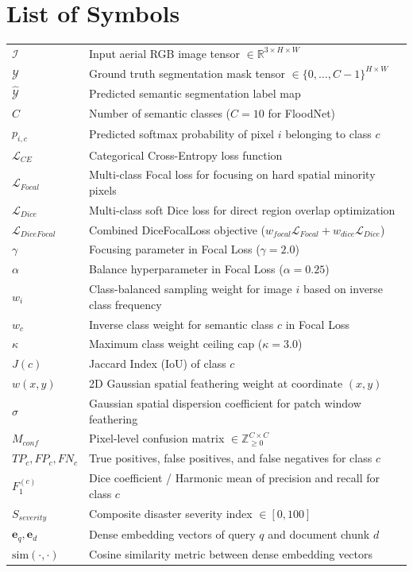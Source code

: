 \documentclass[a4paper, 12pt]{report}
\theoremstyle{definition}
\begin{document}
	\newpage
	\section*{{\huge List of Symbols}\hfill} 
	\vspace{0.8cm}
	\begin{longtable}{ll}
		$\mathcal{I}$ & Input aerial RGB image tensor $\in \mathbb{R}^{3 \times H \times W}$ \\
		$\mathcal{Y}$ & Ground truth segmentation mask tensor $\in \{0, \dots, C-1\}^{H \times W}$ \\
		$\hat{\mathcal{Y}}$ & Predicted semantic segmentation label map \\
		$C$ & Number of semantic classes ($C=10$ for FloodNet) \\
		$p_{i,c}$ & Predicted softmax probability of pixel $i$ belonging to class $c$ \\
		$\mathcal{L}_{CE}$ & Categorical Cross-Entropy loss function \\
		$\mathcal{L}_{Focal}$ & Multi-class Focal loss for focusing on hard spatial minority pixels \\
		$\mathcal{L}_{Dice}$ & Multi-class soft Dice loss for direct region overlap optimization \\
		$\mathcal{L}_{DiceFocal}$ & Combined DiceFocalLoss objective ($w_{focal} \mathcal{L}_{Focal} + w_{dice} \mathcal{L}_{Dice}$) \\
		$\gamma$ & Focusing parameter in Focal Loss ($\gamma = 2.0$) \\
		$\alpha$ & Balance hyperparameter in Focal Loss ($\alpha = 0.25$) \\
		$w_i$ & Class-balanced sampling weight for image $i$ based on inverse class frequency \\
		$w_c$ & Inverse class weight for semantic class $c$ in Focal Loss \\
		$\kappa$ & Maximum class weight ceiling cap ($\kappa = 3.0$) \\
		$J(c)$ & Jaccard Index (IoU) of class $c$ \\
		$w(x, y)$ & 2D Gaussian spatial feathering weight at coordinate $(x, y)$ \\
		$\sigma$ & Gaussian spatial dispersion coefficient for patch window feathering \\
		$M_{conf}$ & Pixel-level confusion matrix $\in \mathbb{Z}_{\ge 0}^{C \times C}$ \\
		$TP_c, FP_c, FN_c$ & True positives, false positives, and false negatives for class $c$ \\
		$F_1^{(c)}$ & Dice coefficient / Harmonic mean of precision and recall for class $c$ \\
		$S_{severity}$ & Composite disaster severity index $\in [0, 100]$ \\
		$\mathbf{e}_q, \mathbf{e}_d$ & Dense embedding vectors of query $q$ and document chunk $d$ \\
		$\text{sim}(\cdot, \cdot)$ & Cosine similarity metric between dense embedding vectors \\
	\end{longtable}
\end{document}
